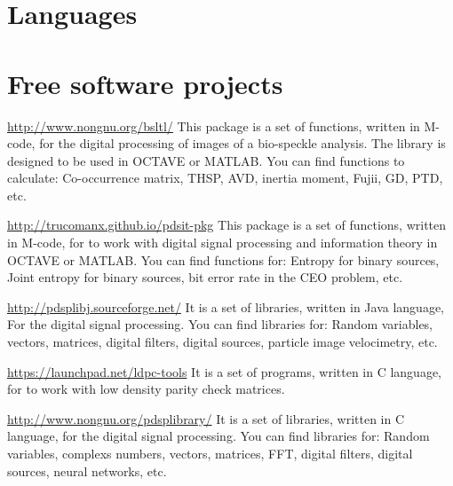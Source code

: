 \documentclass[11pt,a4paper,sans]{moderncv} %
\begin{document}
\section{Languages}


 
\section{Free software projects}

			{\url{http://www.nongnu.org/bsltl/}}
			{}{}
			{This package is a set of functions, written in M-code, 
			for the digital processing of images  of a bio-speckle analysis.
			The library is designed to be used in OCTAVE or MATLAB.
			You can find functions to calculate:
			Co-occurrence matrix, THSP, AVD, inertia moment,
			Fujii, GD, PTD, etc.}

			{\url{http://trucomanx.github.io/pdsit-pkg}}
			{}{}
			{This package is a set of functions, written in M-code, for to work
			with digital signal processing and information theory
			in OCTAVE or MATLAB. You can find functions for:
			Entropy for binary sources, Joint entropy for binary sources,
			bit error rate in the CEO problem, etc. }
			
			{\url{http://pdsplibj.sourceforge.net/}}
			{}{}
			{It is a set of libraries, written in Java language, For
			the digital signal processing. You can find
			libraries for: Random variables,
			vectors, matrices, digital filters,
			digital sources, particle image velocimetry, etc.}

			{\url{https://launchpad.net/ldpc-tools}}
			{}{}
			{It is a set of programs, written in C language, for
			to work with low density parity check matrices.}
			

			{\url{http://www.nongnu.org/pdsplibrary/}}
			{}{}
			{It is a set of libraries, written in C language, for 
			the digital signal processing. You can find libraries for:
			Random variables, complexs numbers, vectors, matrices, FFT,
			digital filters, digital sources, neural networks, etc.}
\end{document}
